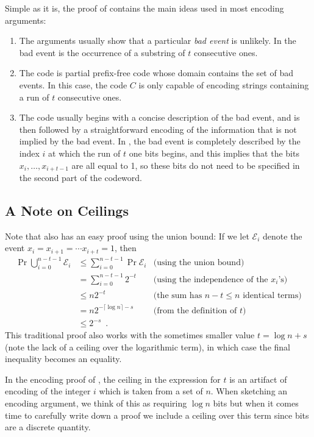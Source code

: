 \documentclass{patmorin}
\begin{document}
Simple as it is, the proof of  contains the main ideas
used in most encoding arguments:

\begin{enumerate}
\item The arguments usually show that a particular \emph{bad event} is
  unlikely. In  the bad event is the occurrence of a
  substring of $t$ consecutive ones.

\item The code is partial prefix-free code whose domain contains the
  set of bad events. In this case, the code $C$ is only capable of
  encoding strings containing a run of $t$ consecutive ones.

\item The code usually begins with a concise description of the bad
  event, and is then followed by a straightforward encoding of the
  information that is not implied by the bad event. In
  , the bad event is completely described by the index
  $i$ at which the run of $t$ one bits begins, and this implies that the
  bits $x_i,\ldots,x_{i+t-1}$ are all equal to 1, so these bits do not
  need to be specified in the second part of the codeword.
\end{enumerate}

\subsection{A Note on Ceilings}

Note that  also has an easy proof using the union
bound: If we let $\mathcal{E}_i$ denote the event
$x_i=x_{i+1}=\cdots x_{i+t}=1$, then
\begin{align*}
\Pr \bigcup_{i=0}^{n-t-1} \mathcal{E}_i  
   & \le \sum_{i=0}^{n-t-1} \Pr\mathcal{E}_i & \text{(using the union bound)}\\
   & = \sum_{i=0}^{n-t-1} 2^{-t} & \text{(using the independence of the $x_i$'s)}\\
   & \le n2^{-t} & \text{(the sum has $n-t\le n$ identical terms)}\\
   & = n2^{-\lceil\log n\rceil-s} & \text{(from the definition of $t$)}\\
   & \le 2^{-s} \enspace .
\end{align*}
This traditional proof also works with the sometimes smaller value
$t=\log n+s$ (note the lack of a ceiling over the logarithmic term),
in which case the final inequality becomes an equality.

In the encoding proof of , the ceiling in the
expression for $t$ is an artifact of encoding of the integer $i$ which
is taken from a set of $n$. When sketching an encoding argument, we
think of this as requiring $\log n$ bits but when it comes time to
carefully write down a proof we include a ceiling over this term since
bits are a discrete quantity.
\end{document}
